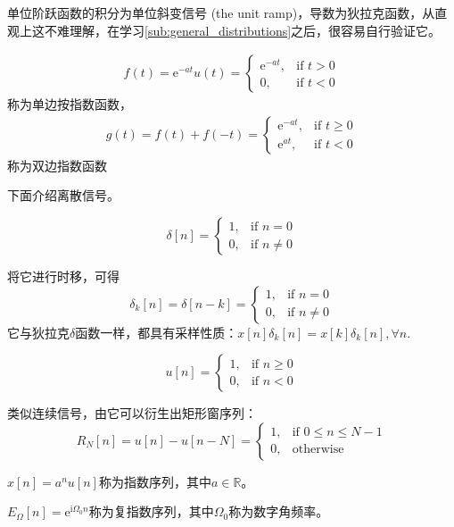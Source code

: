\begin{definition}
\begin{definition}
单位阶跃函数的积分为单位斜变信号 (the unit ramp)，导数为狄拉克函数，从直观上这不难理解，在学习\ref{sub:general_distributions}之后，很容易自行验证它。

\begin{definition}[单边指数函数和双边指数函数]
    \begin{align*}
    f(t)=\mathrm{e}^{-at}u(t)=\begin{cases}
        \mathrm{e}^{-at}, & \text{if }t>0 \\
        0,       & \text{if }t<0
    \end{cases}
\end{align*}
称为单边按指数函数，
\begin{align*}g(t)=f(t)+f(-t)=\begin{cases}
        \mathrm{e}^{-at}, & \text{if }t\geq 0 \\
        \mathrm{e}^{at},  & \text{if }t<0
    \end{cases}
\end{align*}
称为双边指数函数
\end{definition}

下面介绍离散信号。
\begin{definition}
    \[\delta[n]=\begin{cases}
        1, & \text{if }n=0     \\
        0, & \text{if }n\neq 0
    \end{cases}\]
\end{definition}
将它进行时移，可得\[\delta_k[n]=\delta[n-k]=\begin{cases}
        1, & \text{if }n=0     \\
        0, & \text{if }n\neq 0
    \end{cases}\]
它与狄拉克$\delta$函数一样，都具有采样性质：$x[n]\delta_k[n]=x[k]\delta_k[n],\forall n$.
\begin{definition}[单位阶跃序列]
    \[u[n]=\begin{cases}
        1, & \text{if }n\geq 0 \\
        0, & \text{if }n< 0
    \end{cases}\]
\end{definition}
类似连续信号，由它可以衍生出矩形窗序列：
\[R_N[n]=u[n]-u[n-N]=\begin{cases}
        1, & \text{if }0\leq n\leq N-1 \\
        0, & \text{otherwise}
    \end{cases}\]

\begin{definition}[指数序列]
    $x[n]=a^n u[n]$称为指数序列，其中$a\in\mathbb{R}$。
\end{definition}
\begin{definition}[复指数序列]
    $E_{\Omega}[n]=\mathrm{e}^{\mathrm{i}\Omega_0 n}$称为复指数序列，其中$\Omega_0$称为数字角频率。
\end{definition}


\end{definition}
\end{definition}
